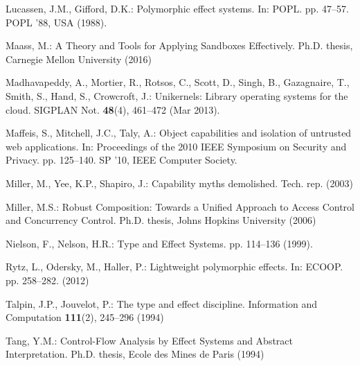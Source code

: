 \documentclass[runningheads]{llncs}
\begin{document}
\begin{thebibliography}{10}
Lucassen, J.M., Gifford, D.K.: Polymorphic effect systems. In: POPL.
  pp. 47--57. POPL '88, USA (1988).

Maass, M.: {A Theory and Tools for Applying Sandboxes Effectively}. Ph.D.
  thesis, Carnegie Mellon University (2016)

Madhavapeddy, A., Mortier, R., Rotsos, C., Scott, D., Singh, B., Gazagnaire,
  T., Smith, S., Hand, S., Crowcroft, J.: Unikernels: Library operating systems
  for the cloud. SIGPLAN Not.  \textbf{48}(4),  461--472 (Mar 2013).

Maffeis, S., Mitchell, J.C., Taly, A.: Object capabilities and isolation of
  untrusted web applications. In: Proceedings of the 2010 IEEE Symposium on
  Security and Privacy. pp. 125--140. SP '10, IEEE Computer Society.

Miller, M., Yee, K.P., Shapiro, J.: Capability myths demolished. Tech. rep.
  (2003)

Miller, M.S.: Robust Composition: Towards a Unified Approach to Access Control
  and Concurrency Control. Ph.D. thesis, Johns Hopkins University (2006)

Nielson, F., Nelson, H.R.: {Type and Effect Systems}. pp. 114--136 (1999).

Rytz, L., Odersky, M., Haller, P.: Lightweight polymorphic effects. In: ECOOP.
  pp. 258--282. (2012)

Talpin, J.P., Jouvelot, P.: The type and effect discipline. Information and
  Computation  \textbf{111}(2),  245--296 (1994)

Tang, Y.M.: Control-Flow Analysis by Effect Systems and Abstract
  Interpretation. Ph.D. thesis, Ecole des Mines de Paris (1994)

\end{thebibliography}
\end{document}
